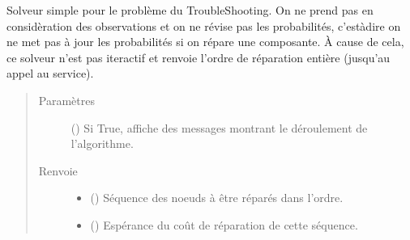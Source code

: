 \documentclass[letterpaper,10pt,french]{sphinxmanual}
\begin{document}
\begin{fulllineitems}
\begin{fulllineitems}
\begin{quote}
\begin{description}
\end{description}\end{quote}

\end{fulllineitems}


\begin{fulllineitems}
\label{\detokenize{index:DecisionTheoreticTroubleshooting.TroubleShootingProblem.simple_solver}}
Solveur simple pour le problème du TroubleShooting.
On ne prend pas en considèration des observations et on ne révise pas
les probabilités, c’est\sphinxhyphen{}à\sphinxhyphen{}dire on ne met pas à jour les probabilités
si on répare une composante.
À cause de cela, ce solveur n’est pas iteractif et renvoie l’ordre de
réparation entière (jusqu’au appel au service).
\begin{quote}\begin{description}
\item[{Paramètres}] \leavevmode
{} (\sphinxstyleliteralemphasis{\sphinxupquote{, }}) \textendash{} Si True, affiche des messages montrant le déroulement de
l’algorithme.

\item[{Renvoie}] \leavevmode
\begin{itemize}
\item {} 
 () \textendash{} Séquence des noeuds à être réparés dans l’ordre.

\item {} 
 () \textendash{} Espérance du coût de réparation de cette séquence.

\end{itemize}


\end{description}\end{quote}

\end{fulllineitems}



\end{fulllineitems}
\end{document}
